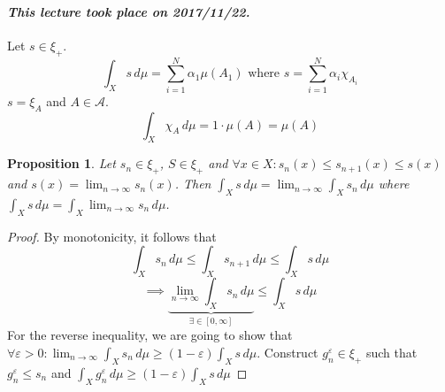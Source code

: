 \documentclass{article}
\newtheorem{proposition}{Proposition}  \numberwithin{proposition}{section}
\newcommand{\dateref}[1]{\paragraph{\textit{This lecture took place on #1.}}}
\begin{document}
\dateref{2017/11/22}

Let $s \in \xi_+$.
\[ \int_X s \, d\mu = \sum_{i=1}^N \alpha_1 \mu(A_1) \text{ where } s = \sum_{i=1}^N \alpha_i \chi_{A_i} \]
$s = \xi_A$ and $A \in \mathcal A$.
\[ \int_X \chi_A \, d\mu = 1 \cdot \mu(A) = \mu(A) \]

\begin{proposition} %
  Let $s_n \in \xi_+$, $S \in \xi_+$ and $\forall x \in X: s_n(x) \leq s_{n+1}(x) \leq s(x)$
  and $s(x) = \lim_{n\to\infty} s_n(x)$. Then $\int_X s \, d\mu = \lim_{n\to\infty} \int_X s_n \, d\mu$
  where $\int_X s \, d\mu = \int_X \lim_{n\to\infty} s_n \, d\mu$.
\end{proposition}

\begin{proof}
  By monotonicity, it follows that
  \[ \int_X s_n \, d\mu \leq \int_X s_{n+1} \, d\mu \leq \int_X s \, d\mu \]
  \[ \implies \underbrace{\lim_{n\to\infty} \int_X s_n \, d\mu}_{\exists \in [0,\infty]} \leq \int_X s \, d\mu \]
  For the reverse inequality, we are going to show that $\forall \varepsilon > 0: \lim_{n\to\infty} \int_X s_n \, d\mu \geq (1 - \varepsilon) \int_X s \, d\mu$.
  Construct $g_n^{\varepsilon} \in \xi_+$ such that $g_n^\varepsilon \leq s_n$ and $\int_X g_n^{\varepsilon} \, d\mu \geq (1 - \varepsilon) \int_X s \, d\mu$


\end{proof}
\end{document}
